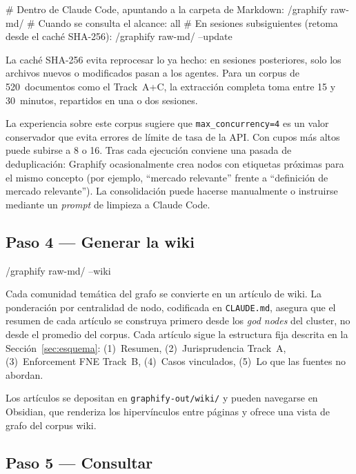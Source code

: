 \documentclass[12pt,a4paper]{article}
\begin{document}
\begin{codebox}
# Dentro de Claude Code, apuntando a la carpeta de Markdown:
/graphify raw-md/
# Cuando se consulta el alcance: all
# En sesiones subsiguientes (retoma desde el caché SHA-256):
/graphify raw-md/ --update
\end{codebox}

La caché SHA-256 evita reprocesar lo ya hecho: en sesiones posteriores, solo los
archivos nuevos o modificados pasan a los agentes. Para un corpus de
520~documentos como el Track~A+C, la extracción completa toma entre 15 y
30~minutos, repartidos en una o dos sesiones.

\begin{infobox}
La experiencia sobre este corpus sugiere que \texttt{max\_concurrency=4} es un
valor conservador que evita errores de límite de tasa de la API. Con cupos más
altos puede subirse a 8 o 16. Tras cada ejecución conviene una pasada de
deduplicación: Graphify ocasionalmente crea nodos con etiquetas próximas para el
mismo concepto (por ejemplo, ``mercado relevante'' frente a ``definición de
mercado relevante''). La consolidación puede hacerse manualmente o instruirse
mediante un \emph{prompt} de limpieza a Claude Code.
\end{infobox}

\subsection{Paso 4 — Generar la wiki}

\begin{codebox}
/graphify raw-md/ --wiki
\end{codebox}

Cada comunidad temática del grafo se convierte en un artículo de wiki. La
ponderación por centralidad de nodo, codificada en \texttt{CLAUDE.md}, asegura
que el resumen de cada artículo se construya primero desde los \emph{god nodes}
del cluster, no desde el promedio del corpus. Cada artículo sigue la estructura
fija descrita en la Sección~\ref{sec:esquema}: (1)~Resumen, (2)~Jurisprudencia
Track~A, (3)~Enforcement FNE Track~B, (4)~Casos vinculados, (5)~Lo que las
fuentes no abordan.

Los artículos se depositan en \texttt{graphify-out/wiki/} y pueden navegarse en
Obsidian, que renderiza los hipervínculos entre páginas y ofrece una vista de
grafo del corpus wiki.

\subsection{Paso 5 — Consultar}
\end{document}
